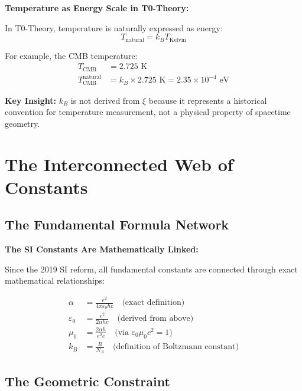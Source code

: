 \documentclass[12pt,a4paper]{article}
\begin{document}
	\begin{insight}
		\textbf{Temperature as Energy Scale in T0-Theory:}
		
		In T0-Theory, temperature is naturally expressed as energy:
		\begin{equation}
			T_{\text{natural}} = k_B T_{\text{Kelvin}}
		\end{equation}
		
		For example, the CMB temperature:
		\begin{align}
			T_{\text{CMB}} &= 2.725 \text{ K} \\
			T_{\text{CMB}}^{\text{natural}} &= k_B \times 2.725 \text{ K} = 2.35 \times 10^{-4} \text{ eV}
		\end{align}
		
		\textbf{Key Insight:} $k_B$ is not derived from $\xi$ because it represents a historical convention for temperature measurement, not a physical property of spacetime geometry.
	\end{insight}
	
	\section{The Interconnected Web of Constants}
	
	\subsection{The Fundamental Formula Network}
	
	\begin{derivation}
		\textbf{The SI Constants Are Mathematically Linked:}
		
		Since the 2019 SI reform, all fundamental constants are connected through exact mathematical relationships:
		
		\begin{align}
			\alpha &= \frac{e^2}{4\pi\varepsilon_0\hbar c} \quad \text{(exact definition)} \\
			\varepsilon_0 &= \frac{e^2}{2\alpha h c} \quad \text{(derived from above)} \\
			\mu_0 &= \frac{2\alpha h}{e^2 c} \quad \text{(via } \varepsilon_0\mu_0c^2 = 1) \\
			k_B &= \frac{R}{N_A} \quad \text{(definition of Boltzmann constant)}
		\end{align}
	\end{derivation}
	
	\subsection{The Geometric Constraint}
	
\end{document}
